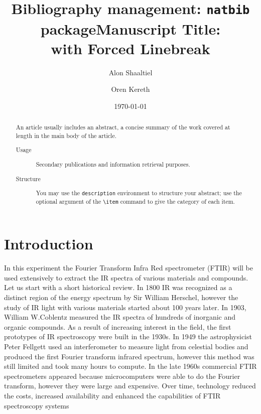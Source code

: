 \documentclass[reprint,amsmath,amssymb,aps, prl]{revtex4-2}
\title{Bibliography management: \texttt{natbib} package}
\begin{document}

\title{Manuscript Title:\\with Forced Linebreak}%


\author{Alon Shaaltiel}
\author{Oren Kereth}



\date{\today}%

\begin{abstract}
An article usually includes an abstract, a concise summary of the work
covered at length in the main body of the article. 
\begin{description}
\item[Usage]
Secondary publications and information retrieval purposes.
\item[Structure]
You may use the \texttt{description} environment to structure your abstract;
use the optional argument of the \verb+\item+ command to give the category of each item. 
\end{description}
\end{abstract}

\maketitle
\renewcommand*{\thesection}{\arabic{section}}
\renewcommand*{\thesubsection}{\arabic{section}.\arabic{subsection}}
\renewcommand{\thefigure}{\arabic{section}.\arabic{figure}}

\section{Introduction}
In this experiment the Fourier Transform Infra Red spectrometer (FTIR) will be used extensively to extract the IR spectra of various materials and compounds. Let us start with a short historical review. In 1800 IR was recognized as a distinct region of the energy spectrum by Sir William Herschel, however the study of IR light with various materials started about 100 years later. In 1903, William W.Coblentz measured the IR spectra of hundreds of inorganic and organic compounds. As a result of increasing interest in the field, the first prototypes of IR spectroscopy were built in the 1930s.  In 1949 the astrophysicist Peter Fellgett used an interferometer to measure light from celestial bodies and produced the first Fourier transform infrared spectrum, however this method was still limited and took many hours to compute. In the late 1960s commercial FTIR spectrometers appeared because microcomputers were able to do the Fourier transform, however they were large and expensive. Over time, technology reduced the costs, increased availability and enhanced the capabilities of FTIR spectroscopy systems\cite{spechistory}
\end{document}
